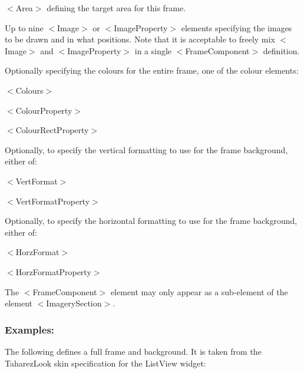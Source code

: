 \begin{DoxyItemize}
\item {\ttfamily $<$Area$>$} defining the target area for this frame. 
\item Up to nine {\ttfamily $<$Image$>$} or {\ttfamily $<$Image\+Property$>$} elements specifying the images to be drawn and in what positions. Note that it is acceptable to freely mix {\ttfamily $<$Image$>$} and {\ttfamily $<$Image\+Property$>$} in a single {\ttfamily $<$Frame\+Component$>$} definition.


\item Optionally specifying the colours for the entire frame, one of the colour elements\+: 
\begin{DoxyItemize}
\item {\ttfamily $<$Colours$>$} 
\item {\ttfamily $<$Colour\+Property$>$} 
\item {\ttfamily $<$Colour\+Rect\+Property$>$} 
\end{DoxyItemize}


\item Optionally, to specify the vertical formatting to use for the frame background, either of\+: 
\begin{DoxyItemize}
\item {\ttfamily $<$Vert\+Format$>$} 
\item {\ttfamily $<$Vert\+Format\+Property$>$} 
\end{DoxyItemize}


\item Optionally, to specify the horizontal formatting to use for the frame background, either of\+: 
\begin{DoxyItemize}
\item {\ttfamily $<$Horz\+Format$>$} 
\item {\ttfamily $<$Horz\+Format\+Property$>$} 
\end{DoxyItemize}


\item The {\ttfamily $<$Frame\+Component$>$} element may only appear as a sub-\/element of the element {\ttfamily $<$Imagery\+Section$>$}. 
\end{DoxyItemize}\hypertarget{fal_element_ref_fal_elem_ref_sec_14_4}{}\subsubsection{Examples\+:}\label{fal_element_ref_fal_elem_ref_sec_14_4}
The following defines a full frame and background. It is taken from the Taharez\+Look skin specification for the List\+View widget\+:


